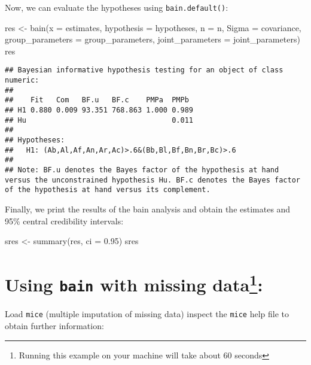 \documentclass[
]{book}
\newenvironment{Shaded}{\begin{snugshade}}{\end{snugshade}}
\newcommand{\AttributeTok}[1]{\textcolor[rgb]{0.77,0.63,0.00}{#1}}
\newcommand{\FloatTok}[1]{\textcolor[rgb]{0.00,0.00,0.81}{#1}}
\newcommand{\FunctionTok}[1]{\textcolor[rgb]{0.00,0.00,0.00}{#1}}
\newcommand{\NormalTok}[1]{#1}
\newcommand{\OtherTok}[1]{\textcolor[rgb]{0.56,0.35,0.01}{#1}}
\begin{document}
Now, we can evaluate the hypotheses using \texttt{bain.default()}:

\begin{Shaded}
\begin{Highlighting}[]
\NormalTok{res }\OtherTok{\textless{}{-}} \FunctionTok{bain}\NormalTok{(}\AttributeTok{x =}\NormalTok{ estimates,}
            \AttributeTok{hypothesis =}\NormalTok{ hypotheses,}
            \AttributeTok{n =}\NormalTok{ n,}
            \AttributeTok{Sigma =}\NormalTok{ covariance,}
            \AttributeTok{group\_parameters =}\NormalTok{ group\_parameters,}
            \AttributeTok{joint\_parameters =}\NormalTok{ joint\_parameters)}
\NormalTok{res}
\end{Highlighting}
\end{Shaded}

\begin{verbatim}
## Bayesian informative hypothesis testing for an object of class numeric:
## 
##    Fit   Com   BF.u   BF.c    PMPa  PMPb 
## H1 0.880 0.009 93.351 768.863 1.000 0.989
## Hu                                  0.011
## 
## Hypotheses:
##   H1: (Ab,Al,Af,An,Ar,Ac)>.6&(Bb,Bl,Bf,Bn,Br,Bc)>.6
## 
## Note: BF.u denotes the Bayes factor of the hypothesis at hand versus the unconstrained hypothesis Hu. BF.c denotes the Bayes factor of the hypothesis at hand versus its complement.
\end{verbatim}

Finally, we print the results of the bain analysis and obtain the estimates and 95\%
central credibility intervals:

\begin{Shaded}
\begin{Highlighting}[]
\NormalTok{sres }\OtherTok{\textless{}{-}} \FunctionTok{summary}\NormalTok{(res, }\AttributeTok{ci =} \FloatTok{0.95}\NormalTok{)}
\NormalTok{sres}
\end{Highlighting}
\end{Shaded}

\hypertarget{using-bain-with-missing-data}{%
\section[Using \texttt{bain} with missing data:]{\texorpdfstring{Using \texttt{bain} with missing data\footnote{Running this example on your machine will take about 60 seconds}:}{Using bain with missing data:}}\label{using-bain-with-missing-data}}

Load \texttt{mice} (multiple imputation of missing data) inspect the \texttt{mice} help file to obtain further information:
\end{document}
